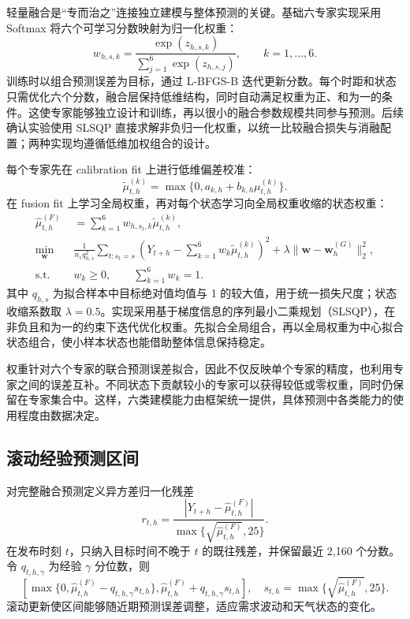 \documentclass[UTF8,11pt,a4paper]{ctexart}
\begin{document}
轻量融合是“专而治之”连接独立建模与整体预测的关键。基础六专家实现采用 Softmax 将六个可学习分数映射为归一化权重：
\begin{equation}
 w_{h,s,k}=\frac{\exp(z_{h,s,k})}{\sum_{j=1}^{6}\exp(z_{h,s,j})},
 \qquad k=1,\ldots,6.
 \label{eq:softmax-fusion}
\end{equation}
训练时以组合预测误差为目标，通过 L-BFGS-B 迭代更新分数。每个时距和状态只需优化六个分数，融合层保持低维结构，同时自动满足权重为正、和为一的条件。这使专家能够独立设计和训练，再以很小的融合参数规模共同参与预测。后续确认实验使用 SLSQP 直接求解非负归一化权重，以统一比较融合损失与消融配置；两种实现均遵循低维加权组合的设计。

每个专家先在 calibration fit 上进行低维偏差校准：
\begin{equation}
  \widetilde\mu^{(k)}_{t,h}=\max\{0,a_{k,h}+b_{k,h}\mu^{(k)}_{t,h}\}.
\end{equation}
在 fusion fit 上学习全局权重，再对每个状态学习向全局权重收缩的状态权重：
\begin{align}
  \widehat\mu^{(F)}_{t,h}&=\sum_{k=1}^{6}w_{h,s_t,k}\widetilde\mu^{(k)}_{t,h},\\
  \min_{\bm w}\quad &\frac{1}{n_s q_{h,s}^2}\sum_{t:s_t=s}\left(Y_{t+h}-\sum_{k=1}^{6}w_k\widetilde\mu^{(k)}_{t,h}\right)^2
  +\lambda\lVert\bm w-\bm w_h^{(G)}\rVert_2^2,\\
  \text{s.t.}\quad &w_k\ge 0,\qquad \sum_{k=1}^{6}w_k=1.
\end{align}
其中 $q_{h,s}$ 为拟合样本中目标绝对值均值与 1 的较大值，用于统一损失尺度；状态收缩系数取 $\lambda=0.5$。实现采用基于梯度信息的序列最小二乘规划（SLSQP），在非负且和为一的约束下迭代优化权重。先拟合全局组合，再以全局权重为中心拟合状态组合，使小样本状态也能借助整体信息保持稳定。

权重针对六个专家的联合预测误差拟合，因此不仅反映单个专家的精度，也利用专家之间的误差互补。不同状态下贡献较小的专家可以获得较低或零权重，同时仍保留在专家集合中。这样，六类建模能力由框架统一提供，具体预测中各类能力的使用程度由数据决定。

\subsection{滚动经验预测区间}

对完整融合预测定义异方差归一化残差
\begin{equation}
  r_{t,h}=\frac{|Y_{t+h}-\widehat\mu^{(F)}_{t,h}|}{\max\{\sqrt{\widehat\mu^{(F)}_{t,h}},25\}}.
\end{equation}
在发布时刻 $t$，只纳入目标时间不晚于 $t$ 的既往残差，并保留最近 2,160 个分数。令 $q_{t,h,\gamma}$ 为经验 $\gamma$ 分位数，则
\begin{equation}
  \left[\max\{0,\widehat\mu^{(F)}_{t,h}-q_{t,h,\gamma}s_{t,h}\},
  \widehat\mu^{(F)}_{t,h}+q_{t,h,\gamma}s_{t,h}\right],
  \quad s_{t,h}=\max\{\sqrt{\widehat\mu^{(F)}_{t,h}},25\}.
\end{equation}
滚动更新使区间能够随近期预测误差调整，适应需求波动和天气状态的变化。
\end{document}

